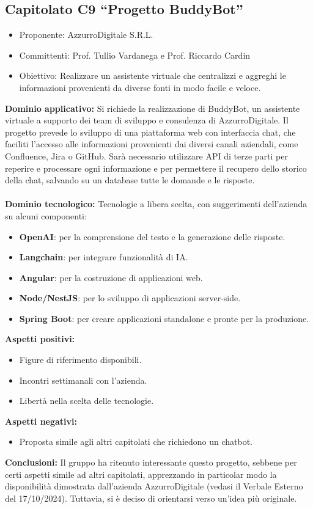\documentclass[10pt]{article}
\begin{document}
\subsection{Capitolato C9 “Progetto BuddyBot”}
\begin{itemize}
    \item Proponente: AzzurroDigitale S.R.L.
    \item Committenti: Prof. Tullio Vardanega e Prof. Riccardo Cardin
    \item Obiettivo: Realizzare un assistente virtuale che centralizzi e aggreghi le informazioni provenienti da diverse fonti in modo facile e veloce.
\end{itemize}
\textbf{Dominio applicativo:}  
Si richiede la realizzazione di BuddyBot, un assistente virtuale a supporto dei team di sviluppo e consulenza di AzzurroDigitale. Il progetto prevede lo sviluppo di una piattaforma web con interfaccia chat, che faciliti l’accesso alle informazioni provenienti dai diversi canali aziendali, come Confluence, Jira o GitHub. Sarà necessario utilizzare API di terze parti per reperire e processare ogni informazione e per permettere il recupero dello storico della chat, salvando su un database tutte le domande e le risposte.\\
\\
\textbf{Dominio tecnologico:}  
Tecnologie a libera scelta, con suggerimenti dell’azienda su alcuni componenti:
\begin{itemize}
    \item \textbf{OpenAI}: per la comprensione del testo e la generazione delle risposte.
    \item \textbf{Langchain}: per integrare funzionalità di IA.
    \item \textbf{Angular}: per la costruzione di applicazioni web.
    \item \textbf{Node/NestJS}: per lo sviluppo di applicazioni server-side.
    \item \textbf{Spring Boot}: per creare applicazioni standalone e pronte per la produzione.
\end{itemize}
\textbf{Aspetti positivi:}
\begin{itemize}
    \item Figure di riferimento disponibili.
    \item Incontri settimanali con l’azienda.
    \item Libertà nella scelta delle tecnologie.
\end{itemize}
\textbf{Aspetti negativi:}
\begin{itemize}
    \item Proposta simile agli altri capitolati che richiedono un chatbot.
\end{itemize}
\textbf{Conclusioni:}  
Il gruppo ha ritenuto interessante questo progetto, sebbene per certi aspetti simile ad altri capitolati, apprezzando in particolar modo la disponibilità dimostrata dall’azienda AzzurroDigitale (vedasi il Verbale Esterno del 17/10/2024). Tuttavia, si è deciso di orientarsi verso un’idea più originale.
\end{document}
